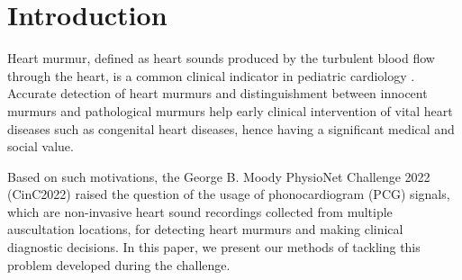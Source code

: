 \section{Introduction}
\label{sec:intro}

Heart murmur, defined as heart sounds produced by the turbulent blood flow through the heart, is a common clinical indicator in pediatric cardiology \cite{Masic_2018}. Accurate detection of heart murmurs and distinguishment between innocent murmurs and pathological murmurs help early clinical intervention of vital heart diseases such as congenital heart diseases, hence having a significant medical and social value.

Based on such motivations, the George B. Moody PhysioNet Challenge 2022 (CinC2022) \cite{Oliveira_2021_CirCor} raised the question of the usage of phonocardiogram (PCG) signals, which are non-invasive heart sound recordings collected from multiple auscultation locations, for detecting heart murmurs and making clinical diagnostic decisions. In this paper, we present our methods of tackling this problem developed during the challenge.
